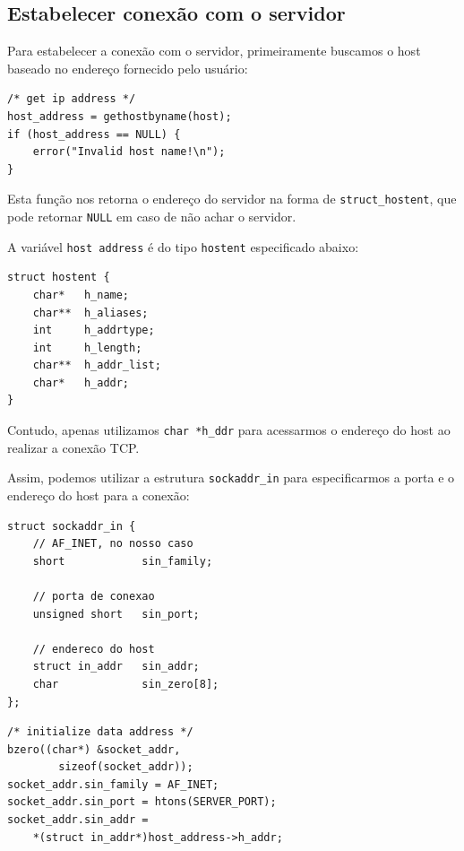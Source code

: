 \documentclass[10pt,twocolumn,letterpaper]{article}
\begin{document}
\subsection{Estabelecer conexão com o servidor}

	Para estabelecer a conexão com o servidor, primeiramente buscamos o host baseado no endereço fornecido pelo usuário:

	\begin{lstlisting}[caption={Função utilizada para acessar o endereço do host}, label=Algorithm]
/* get ip address */
host_address = gethostbyname(host);
if (host_address == NULL) {
    error("Invalid host name!\n");
}
	\end{lstlisting}

	Esta função nos retorna o endereço do servidor na forma de \texttt{struct\_hostent}, que pode retornar \texttt{NULL} em caso de não achar o servidor.

	A variável \texttt{host address} é do tipo \texttt{hostent} especificado abaixo:

	\begin{lstlisting}[caption={struct hostent}, label=Algorithm]
struct hostent {
	char* 	h_name;
	char** 	h_aliases;
	int 	h_addrtype;
	int 	h_length;
	char** 	h_addr_list;
	char* 	h_addr;
}
	\end{lstlisting}

	Contudo, apenas utilizamos \texttt{char *h\_ddr} para acessarmos o endereço do host ao realizar a conexão TCP.

	Assim, podemos utilizar a estrutura \texttt{sockaddr\_in} para especificarmos a porta e o endereço do host para a conexão:

	\begin{lstlisting}[caption={struct sockaddr\_in}, label=Algorithm]
struct sockaddr_in {
    // AF_INET, no nosso caso
    short            sin_family;

    // porta de conexao
    unsigned short   sin_port;

    // endereco do host
    struct in_addr   sin_addr;
    char             sin_zero[8];
};

	\end{lstlisting}

	\begin{lstlisting}[caption={Inicialização de endereço e porta}, label=Algorithm]
/* initialize data address */
bzero((char*) &socket_addr, 
        sizeof(socket_addr));
socket_addr.sin_family = AF_INET;
socket_addr.sin_port = htons(SERVER_PORT);
socket_addr.sin_addr = 
    *(struct in_addr*)host_address->h_addr;

	\end{lstlisting}
\end{document}
